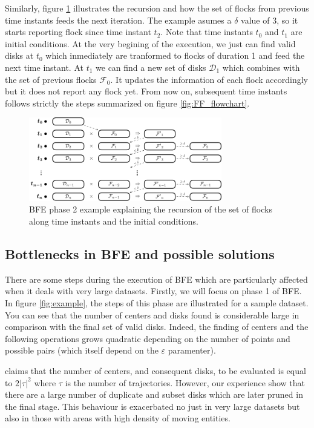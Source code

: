 \documentclass[journal,onecolumn]{IEEEtran}
\begin{document}
Similarly, figure \ref{fig:FF_stages} illustrates the recursion and how the set of flocks from previous time instants feeds the next iteration.  The example asumes a $\delta$ value of 3, so it starts reporting flock since time instant $t_2$.  Note that time instants $t_0$ and $t_1$ are initial conditions.  At the very begining of the execution, we just can find valid disks at $t_0$ which inmediately are tranformed to flocks of duration 1 and feed the next time instant.  At $t_1$ we can find a new set of disks $\mathcal{D}_1$ which combines with the set of previous flocks $\mathcal{F}_0$.  It updates the information of each flock accordingly but it does not report any flock yet.  From now on, subsequent time instants follows strictly the steps summarized on figure \ref{fig:FF_flowchart}.

\begin{figure}[!ht]
    \centering
    \includegraphics[width=0.75\textwidth]{figures/FF_stages}
    \caption{BFE phase 2 example explaining the recursion of the set of flocks along time instants and the initial conditions.}\label{fig:FF_stages}
\end{figure}

\subsection{Bottlenecks in BFE and possible solutions}
There are some steps during the execution of BFE which are particularly affected when it deals with very large datasets.  Firstly, we will focus on phase 1 of BFE.  In figure \ref{fig:example}, the steps of this phase are illustrated for a sample dataset.  You can see that the number of centers and disks found is considerable large in comparison with the final set of valid disks.  Indeed, the finding of centers and the following operations grows quadratic depending on the number of points and possible pairs (which itself depend on the $\varepsilon$ paramenter).   

\cite{vieira_2009} claims that the number of centers, and consequent disks, to be evaluated is equal to $2\lvert\tau\rvert^2$ where $\tau$ is the number of trajectories.  However, our experience show that there are a large number of duplicate and subset disks which are later pruned in the final stage.  This behaviour is exacerbated no just in very large datasets but also in those with areas with high density of moving entities.
\end{document}

